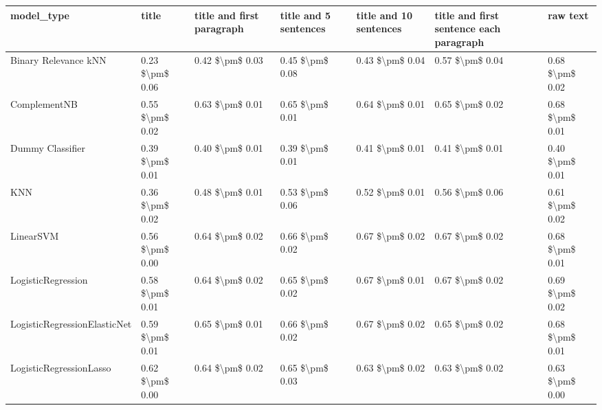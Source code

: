 \begin{tabular}{lllllll}
\toprule
                     model\_type &           title & title and first paragraph & title and 5 sentences & title and 10 sentences & title and first sentence each paragraph &        raw text \\
\midrule
           Binary Relevance kNN & 0.23 \$\textbackslash pm\$ 0.06 &           0.42 \$\textbackslash pm\$ 0.03 &       0.45 \$\textbackslash pm\$ 0.08 &        0.43 \$\textbackslash pm\$ 0.04 &                         0.57 \$\textbackslash pm\$ 0.04 & 0.68 \$\textbackslash pm\$ 0.02 \\
                   ComplementNB & 0.55 \$\textbackslash pm\$ 0.02 &           0.63 \$\textbackslash pm\$ 0.01 &       0.65 \$\textbackslash pm\$ 0.01 &        0.64 \$\textbackslash pm\$ 0.01 &                         0.65 \$\textbackslash pm\$ 0.02 & 0.68 \$\textbackslash pm\$ 0.01 \\
               Dummy Classifier & 0.39 \$\textbackslash pm\$ 0.01 &           0.40 \$\textbackslash pm\$ 0.01 &       0.39 \$\textbackslash pm\$ 0.01 &        0.41 \$\textbackslash pm\$ 0.01 &                         0.41 \$\textbackslash pm\$ 0.01 & 0.40 \$\textbackslash pm\$ 0.01 \\
                            KNN & 0.36 \$\textbackslash pm\$ 0.02 &           0.48 \$\textbackslash pm\$ 0.01 &       0.53 \$\textbackslash pm\$ 0.06 &        0.52 \$\textbackslash pm\$ 0.01 &                         0.56 \$\textbackslash pm\$ 0.06 & 0.61 \$\textbackslash pm\$ 0.02 \\
                      LinearSVM & 0.56 \$\textbackslash pm\$ 0.00 &           0.64 \$\textbackslash pm\$ 0.02 &       0.66 \$\textbackslash pm\$ 0.02 &        0.67 \$\textbackslash pm\$ 0.02 &                         0.67 \$\textbackslash pm\$ 0.02 & 0.68 \$\textbackslash pm\$ 0.01 \\
             LogisticRegression & 0.58 \$\textbackslash pm\$ 0.01 &           0.64 \$\textbackslash pm\$ 0.02 &       0.65 \$\textbackslash pm\$ 0.02 &        0.67 \$\textbackslash pm\$ 0.01 &                         0.67 \$\textbackslash pm\$ 0.02 & 0.69 \$\textbackslash pm\$ 0.02 \\
   LogisticRegressionElasticNet & 0.59 \$\textbackslash pm\$ 0.01 &           0.65 \$\textbackslash pm\$ 0.01 &       0.66 \$\textbackslash pm\$ 0.02 &        0.67 \$\textbackslash pm\$ 0.02 &                         0.65 \$\textbackslash pm\$ 0.02 & 0.68 \$\textbackslash pm\$ 0.01 \\
        LogisticRegressionLasso & 0.62 \$\textbackslash pm\$ 0.00 &           0.64 \$\textbackslash pm\$ 0.02 &       0.65 \$\textbackslash pm\$ 0.03 &        0.63 \$\textbackslash pm\$ 0.02 &                         0.63 \$\textbackslash pm\$ 0.02 & 0.63 \$\textbackslash pm\$ 0.00 \\

\end{tabular}
